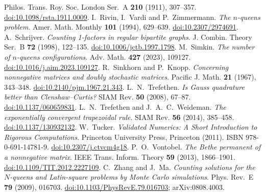 Philos. Trans. Roy. Soc. London Ser.~A \textbf{210} (1911), 307--357.
\href{https://doi.org/10.1098/rsta.1911.0009}{doi:10.1098/rsta.1911.0009}.
I.~Rivin, I.~Vardi and P.~Zimmermann.
\emph{The $n$-queens problem}.
Amer. Math. Monthly \textbf{101} (1994), 629--639.
\href{https://doi.org/10.2307/2974691}{doi:10.2307/2974691}.
A.~Schrijver.
\emph{Counting 1-factors in regular bipartite graphs}.
J. Combin. Theory Ser.~B \textbf{72} (1998), 122--135.
\href{https://doi.org/10.1006/jctb.1997.1798}{doi:10.1006/jctb.1997.1798}.
M.~Simkin. \emph{The number of $n$-queens configurations}.
Adv. Math. \textbf{427} (2023), 109127.
\href{https://doi.org/10.1016/j.aim.2023.109127}{doi:10.1016/j.aim.2023.109127}.
R.~Sinkhorn and P.~Knopp.
\emph{Concerning nonnegative matrices and doubly stochastic matrices}.
Pacific J. Math. \textbf{21} (1967), 343--348.
\href{https://doi.org/10.2140/pjm.1967.21.343}{doi:10.2140/pjm.1967.21.343}.
L.~N.~Trefethen.
\emph{Is Gauss quadrature better than Clenshaw--Curtis?}
SIAM Rev. \textbf{50} (2008), 67--87.
\href{https://doi.org/10.1137/060659831}{doi:10.1137/060659831}.
L.~N.~Trefethen and J.~A.~C.~Weideman.
\emph{The exponentially convergent trapezoidal rule}.
SIAM Rev. \textbf{56} (2014), 385--458.
\href{https://doi.org/10.1137/130932132}{doi:10.1137/130932132}.
W.~Tucker.
\emph{Validated Numerics: A Short Introduction to Rigorous Computations}.
Princeton University Press, Princeton (2011). ISBN 978-0-691-14781-9.
\href{https://doi.org/10.2307/j.ctvcm4g18}{doi:10.2307/j.ctvcm4g18}.
P.~O.~Vontobel.
\emph{The Bethe permanent of a nonnegative matrix}.
IEEE Trans. Inform. Theory \textbf{59} (2013), 1866--1901.
\href{https://doi.org/10.1109/TIT.2012.2227109}{doi:10.1109/TIT.2012.2227109}.
C.~Zhang and J.~Ma.
\emph{Counting solutions for the $N$-queens and Latin-square problems by Monte Carlo simulations}.
Phys. Rev.~E \textbf{79} (2009), 016703.
\href{https://doi.org/10.1103/PhysRevE.79.016703}{doi:10.1103/PhysRevE.79.016703}; arXiv:0808.4003.
